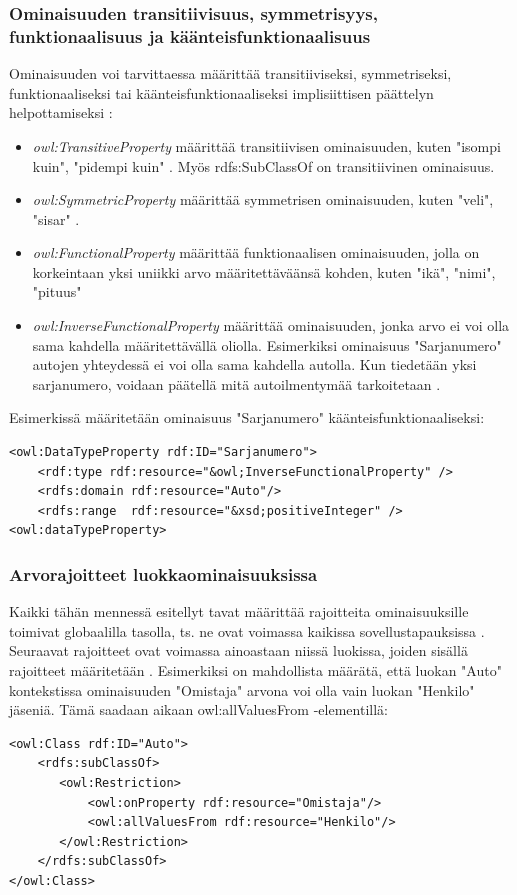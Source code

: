 \documentclass[finnish]{tktltiki2}
\theoremstyle{definition}
\theoremstyle{remark}
\begin{document}
\subsubsection{Ominaisuuden transitiivisuus, symmetrisyys, funktionaalisuus ja käänteisfunktionaalisuus}
Ominaisuuden voi tarvittaessa määrittää transitiiviseksi, symmetriseksi, funktionaaliseksi tai käänteisfunktionaaliseksi implisiittisen päättelyn helpottamiseksi \cite{AH09}:

\begin{itemize}
 \item \textit{owl:TransitiveProperty} määrittää transitiivisen ominaisuuden, kuten "isompi kuin", "pidempi kuin" \cite{AH09}. Myös rdfs:SubClassOf on transitiivinen ominaisuus. 
 \item \textit{owl:SymmetricProperty} määrittää symmetrisen ominaisuuden, kuten "veli", "sisar" \cite{AH09}.
 \item \textit{owl:FunctionalProperty} määrittää funktionaalisen ominaisuuden, jolla on korkeintaan yksi uniikki arvo määritettäväänsä kohden, kuten "ikä", "nimi", "pituus" \cite{AH09}
 \item \textit{owl:InverseFunctionalProperty} määrittää ominaisuuden, jonka arvo ei voi olla sama kahdella määritettävällä oliolla. Esimerkiksi ominaisuus "Sarjanumero" autojen yhteydessä ei voi olla sama kahdella autolla. Kun tiedetään yksi sarjanumero, voidaan päätellä mitä autoilmentymää tarkoitetaan \cite{AH09}.
\end{itemize}
Esimerkissä määritetään ominaisuus "Sarjanumero" käänteisfunktionaaliseksi:
\begin{verbatim}
<owl:DataTypeProperty rdf:ID="Sarjanumero">
    <rdf:type rdf:resource="&owl;InverseFunctionalProperty" />
    <rdfs:domain rdf:resource="Auto"/>
    <rdfs:range  rdf:resource="&xsd;positiveInteger" />   
<owl:dataTypeProperty>
\end{verbatim}

\subsubsection{Arvorajoitteet luokkaominaisuuksissa}
Kaikki tähän mennessä esitellyt tavat määrittää rajoitteita ominaisuuksille toimivat globaalilla tasolla, ts. ne ovat voimassa kaikissa sovellustapauksissa \cite{SWM04}. Seuraavat rajoitteet ovat voimassa ainoastaan niissä luokissa, joiden sisällä rajoitteet määritetään \cite{SWM04}. Esimerkiksi on mahdollista määrätä, että luokan "Auto" kontekstissa ominaisuuden "Omistaja" arvona voi olla vain luokan "Henkilo" jäseniä. Tämä saadaan aikaan owl:allValuesFrom -elementillä:
\begin{verbatim}
<owl:Class rdf:ID="Auto">
    <rdfs:subClassOf>
       <owl:Restriction>
           <owl:onProperty rdf:resource="Omistaja"/>
           <owl:allValuesFrom rdf:resource="Henkilo"/>
       </owl:Restriction>        
    </rdfs:subClassOf>
</owl:Class>    
\end{verbatim}
\end{document}

